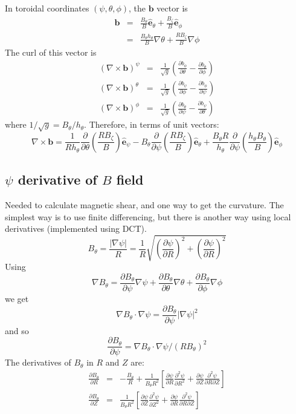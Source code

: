 \documentclass[12pt, a4paper]{article}
\newcommand{\deriv}[2]{\ensuremath{\frac{\partial #1}{\partial #2}}}
\newcommand{\dderiv}[2]{\ensuremath{\frac{\partial^2 #1}{\partial {#2}^2}}}
\newcommand{\hthe}{\ensuremath{h_\theta}}
\newcommand{\Bp}{\ensuremath{B_\theta}}
\newcommand{\Bt}{\ensuremath{B_\zeta}}
\newcommand{\Vec}[1]{\ensuremath{\mathbf{#1}}}
\newcommand{\bvec}{\Vec{b}}
\newcommand{\ehat}{\ensuremath{\hat{\Vec{e}}}}
\begin{document}
In toroidal coordinates $\left(\psi,\theta,\phi\right)$, the $\bvec$ vector
is
\begin{eqnarray*}
\bvec &=& \frac{\Bp}{B}\ehat_\theta + \frac{\Bt}{B}\ehat_\phi \\
&=& \frac{\Bp\hthe}{B}\nabla\theta + \frac{R\Bt}{B}\nabla\phi
\end{eqnarray*}
The curl of this vector is
\begin{eqnarray*}
\left(\nabla\times\bvec\right)^\psi &=& \frac{1}{\sqrt{g}}\left(\deriv{b_\phi}{\theta} - \deriv{b_\theta}{\phi}\right) \\
\left(\nabla\times\bvec\right)^\theta &=& \frac{1}{\sqrt{g}}\left(\deriv{b_\psi}{\phi} - \deriv{b_\phi}{\psi}\right) \\
\left(\nabla\times\bvec\right)^\phi &=& \frac{1}{\sqrt{g}}\left(\deriv{b_\theta}{\psi} - \deriv{b_\psi}{\theta}\right)
\end{eqnarray*}
where $1/\sqrt{g} = \Bp/\hthe$. Therefore, in terms of unit vectors:
\[
\nabla\times\bvec = \frac{1}{R\hthe}\deriv{}{\theta}\left(\frac{R\Bt}{B}\right)\ehat_\psi - \Bp\deriv{}{\psi}\left(\frac{R\Bt}{B}\right)\ehat_\theta + \frac{\Bp R}{\hthe}\deriv{}{\psi}\left(\frac{\hthe\Bp}{B}\right)\ehat_\phi
\]

\subsection{$\psi$ derivative of $B$ field}

Needed to calculate magnetic shear, and one way to get the curvature.
The simplest way is to use finite differencing, but there is another way
using local derivatives (implemented using DCT).
\[
\Bp = \frac{\left|\nabla\psi\right|}{R} = \frac{1}{R}\sqrt{\left(\deriv{\psi}{R}\right)^2 + \left(\deriv{\psi}{R}\right)^2}
\]
Using
\[
\nabla\Bp = \deriv{\Bp}{\psi}\nabla\psi + \deriv{\Bp}{\theta}\nabla\theta + \deriv{\Bp}{\phi}\nabla\phi
\]
we get
\[
\nabla\Bp \cdot\nabla\psi = \deriv{\Bp}{\psi}\left|\nabla\psi\right|^2
\]
and so
\[
\deriv{\Bp}{\psi} = \nabla\Bp \cdot\nabla\psi / \left(R\Bp\right)^2
\]
The derivatives of $\Bp$ in $R$ and $Z$ are:
\begin{eqnarray*}
\deriv{\Bp}{R} &=& -\frac{\Bp}{R} + \frac{1}{\Bp R^2}\left[\deriv{\psi}{R}\dderiv{\psi}{R} + \deriv{\psi}{Z}\frac{\partial^2\psi}{\partial R\partial Z}\right] \\
\deriv{\Bp}{Z} &=& \frac{1}{\Bp R^2}\left[\deriv{\psi}{Z}\dderiv{\psi}{Z} + \deriv{\psi}{R}\frac{\partial^2\psi}{\partial R\partial Z}\right]
\end{eqnarray*}
\end{document}
